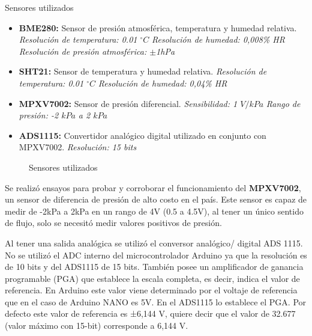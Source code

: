 Sensores utilizados
\begin{itemize}
	\item  \textbf{BME280:} Sensor de presión atmosférica, temperatura y humedad relativa.
\subitem \textit{Resolución de temperatura: 0.01 $^{\circ}C$}
\subitem \textit{Resolución de humedad: 0,008\% HR}
\subitem \textit{Resolución de presión atmosférica: $\pm$1hPa}
	
	\item \textbf{SHT21:} Sensor de temperatura y humedad relativa.
\subitem \textit{Resolución de temperatura: 0.01 $^{\circ}C$}
\subitem \textit{Resolución de humedad: 0,04\% HR}	
	
	\item \textbf{MPXV7002:} Sensor de presión diferencial.
\subitem \textit{Sensibilidad: 1 $V/kPa$}
\subitem \textit{Rango de presión: -2 $kPa$ a 2 $kPa$}	
	
	\item \textbf{ADS1115:} Convertidor analógico digital utilizado en conjunto con MPXV7002.
\subitem \textit{Resolución: 15 bits}
\end{itemize}


\begin{figure}[htbp]
	\centering
	\caption{Sensores utilizados} \label{fig:senstodos}
\end{figure}




Se realizó ensayos para probar y corroborar el funcionamiento del \textbf{MPXV7002}, un sensor de diferencia de presión de alto costo en el país. Este sensor es capaz de medir de -2kPa a 2kPa en un rango de 4V (0.5 a 4.5V), al tener un único sentido de flujo, solo se necesitó medir valores positivos de presión.

Al tener una salida analógica se utilizó el conversor analógico/ digital ADS 1115. 
No se utilizó el ADC interno del microcontrolador Arduino ya que la resolución es de 10 bits y del ADS1115 de 15 bits.
También posee un amplificador de ganancia programable (PGA) que establece la escala completa, es decir, indica el valor de referencia. En Arduino este valor viene determinado por el voltaje de referencia que en el caso de Arduino NANO es 5V. En el ADS1115 lo establece el PGA. Por defecto este valor de referencia es ±6,144 V, quiere decir que el valor de 32.677 (valor máximo con 15-bit) corresponde a 6,144 V. 

